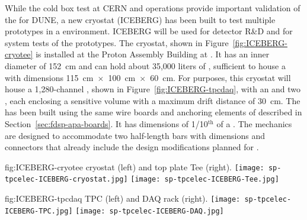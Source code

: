 While the cold box test at CERN and  operations provide important validation of the  for DUNE, a new cryostat (ICEBERG) has been built to test multiple  prototypes in a  environment. %
ICEBERG will be used for 
 detector R\&D and for system tests of the  prototypes. 
The  cryostat, shown in Figure~\ref{fig:ICEBERG-cryotee} is installed
at the Proton Assembly Building at . It has an inner diameter of \SI{152}{cm}
and can hold about 35,000 liters of , sufficient to house a
 with dimensions \SI{115}{cm}~$\times$~\SI{100}{cm}~$\times$~\SI{60}{cm}. For
 purposes, this cryostat will house a 1,280-channel , shown in
Figure~\ref{fig:ICEBERG-tpcdaq}, with an  and two , each 
enclosing a sensitive volume with a maximum drift distance of \SI{30}{cm}. The  
has been built using the same wire boards and anchoring elements of  
described in Section~\ref{sec:fdsp-apa-boards}. It has dimensions of 
1/10$^{\mathrm{th}}$ of a  . The  mechanics are designed to
accommodate two half-length  bars with dimensions and connectors that already 
include the design modifications planned for .

\begin{dunefigure}
  {fig:ICEBERG-cryotee}
	{ cryostat (left) and top plate Tee (right).}
  \texttt{[image: sp-tpcelec-ICEBERG-cryostat.jpg]}
  \texttt{[image: sp-tpcelec-ICEBERG-Tee.jpg]}
\end{dunefigure}

\begin{dunefigure}
  {fig:ICEBERG-tpcdaq}
	{ TPC (left) and DAQ rack (right).}
  \texttt{[image: sp-tpcelec-ICEBERG-TPC.jpg]}
  \texttt{[image: sp-tpcelec-ICEBERG-DAQ.jpg]}
\end{dunefigure}

